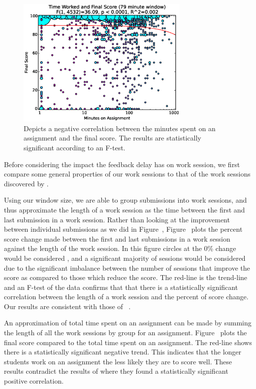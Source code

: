 \begin{figure}[!t]
\centering \includegraphics[width=3.3in]{graphs/Time_Worked_and_Final_Score_(79_minute_window).eps}
\caption{Depicts a negative correlation between the minutes spent on an
  assignment and the final score. The results are statistically significant
  according to an F-test.}
\end{figure}

Before considering the impact the feedback delay has on work session, we first
compare some general properties of our work sessions to that of the work
sessions discovered by \spacco{}.

Using our window size, we are able to group submissions into work sessions, and
thus approximate the length of a work session as the time between the first and
last submission in a work session. Rather than looking at the improvement
between individual submissions as we did in
Figure~, Figure~
plots the percent score change made between the first and last submissions in a
work session against the length of the work session. In this figure circles at
the 0\% change would be considered \noi{}, and a significant majority of
sessions would be considered \imp{} due to the significant imbalance between
the number of sessions that improve the score as compared to those which reduce
the score. The red-line is the trend-line and an F-test of the data confirms
that that there is a statistically significant correlation between the length
of a work session and the percent of score change. Our results are consistent
with those of \spacco{}~\cite{Spacco:2013:TIP:2462476.2465594}.

An approximation of total time spent on an assignment can be made by summing
the length of all the work sessions by group for an
assignment. Figure~ plots the final score compared to
the total time spent on an assignment. The red-line shows there is a
statistically significant negative trend. This indicates that the longer
students work on an assignment the less likely they are to score well. These
results contradict the results of \spacco{} where they found a statistically
significant positive correlation.

